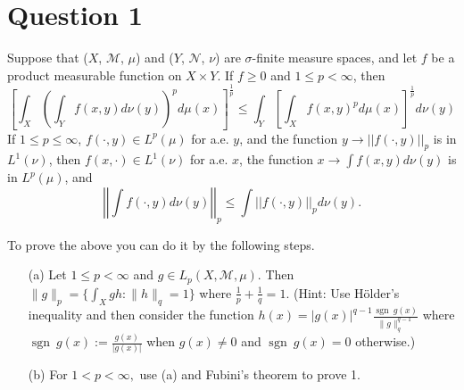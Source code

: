 \section{Question 1}
\horz
Suppose that ($X$, $\mathcal{M}$, $\mu$) and ($Y$, $\mathcal{N}$, $\nu$) are $\sigma$-finite measure spaces, and let $f$ be a product measurable function on $X \times Y.$ If $f \ge 0$ and $1 \le p < \infty$, then
\begin{equation}
 \left[\int_X \left(\int_Y f(x,y) d\nu(y) \right)^pd\mu(x)\right]^\frac{1}{p} \le \int_Y \left[\int_X f(x,y)^p d\mu(x)\right]^\frac{1}{p}d\nu(y)
 \label{eqn:ntp}
 \end{equation}
 If $1 \le p \le \infty$, $f(\cdot, y) \in L^p(\mu)$ for a.e. $y$, and the function $y \to ||f(\cdot, y)||_p$ is in $L^1(\nu)$, then $f(x, \cdot) \in L^1(\nu)$ for a.e. $x$, the function $x \to \int f(x,y) d\nu(y)$ is in $L^p(\mu)$, and $$\left|\left|\int f(\cdot, y)d\nu(y)\right|\right|_p \le \int||f(\cdot, y)||_pd\nu(y).$$  

To prove the above you can do it by the following steps.
\begin{itemize}
\item[(a)] Let $1\leq p<\infty$ and $g\in L_p(X, \mathcal{M}, \mu)$. Then $\|g\|_p=\{\int_{X}gh:\|h\|_q=1\}$ where $\frac{1}{p}+\frac{1}{q}=1.$ (Hint: Use Hölder's inequality and then consider the function $h(x)=|g(x)|^{q-1}\frac{\operatorname{sgn} \ g(x)}{\|g\|_q^{q-1}}$ where $\operatorname{sgn}\ g(x):=\frac{g(x)}{|g(x)|}$ when $g(x)\neq 0$ and $\operatorname{sgn} \ g(x)=0$ otherwise.)
\item[(b)] For $1<p<\infty,$ use (a) and Fubini's theorem to prove 1.
\end{itemize}
\horz

